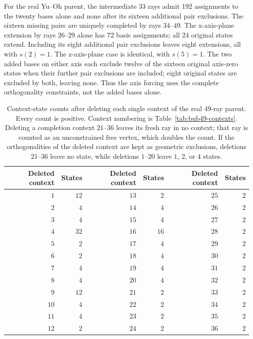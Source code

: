 \documentclass[aps,pra,reprint,superscriptaddress,longbibliography,nofootinbib,floatfix,10pt]{revtex4-2}
\theoremstyle{definition}
\begin{document}
For the real Yu--Oh parent, the intermediate 33 rays admit 192 assignments
to the twenty bases alone and none after its sixteen additional pair
exclusions. The sixteen missing pairs are uniquely completed by rays
$34$--$49$. The x-axis-plane extension by rays $26$--$29$ alone has
72 basis assignments; all 24 original states extend. Including its eight
additional pair exclusions leaves eight extensions, all with $s(2)=1$.
The z-axis-plane case is identical, with $s(5)=1$. The two added bases
on either axis each exclude twelve of the sixteen original axis-zero
states when their further pair exclusions are included; eight original
states are excluded by both, leaving none. Thus the axis forcing uses
the complete orthogonality constraints, not the added bases alone.
\par
\begin{table}[htbp]
\centering\small
\caption{Context-state counts after deleting each single context of the real 49-ray parent. Every count is positive. Context numbering is Table~\ref{tab:bub49-contexts}. Deleting a completion context $21$--$36$ leaves its fresh ray in no context; that ray is counted as an unconstrained free vertex, which doubles the count. If the orthogonalities of the deleted context are kept as geometric exclusions, deletions $21$--$36$ leave no state, while deletions $1$--$20$ leave $1$, $2$, or $4$ states.}\label{tab:parent-criticality}
\begin{tabular}{rr@{\qquad}rr@{\qquad}rr}
\toprule
Deleted context & States & Deleted context & States & Deleted context & States\\\midrule
\rule{0pt}{12pt}$1$ & $12$ & $13$ & $2$ & $25$ & $2$\\
\rule{0pt}{12pt}$2$ & $4$ & $14$ & $4$ & $26$ & $2$\\
\rule{0pt}{12pt}$3$ & $4$ & $15$ & $4$ & $27$ & $2$\\
\rule{0pt}{12pt}$4$ & $32$ & $16$ & $16$ & $28$ & $2$\\
\rule{0pt}{12pt}$5$ & $2$ & $17$ & $4$ & $29$ & $2$\\
\rule{0pt}{12pt}$6$ & $2$ & $18$ & $4$ & $30$ & $2$\\
\rule{0pt}{12pt}$7$ & $4$ & $19$ & $4$ & $31$ & $2$\\
\rule{0pt}{12pt}$8$ & $4$ & $20$ & $4$ & $32$ & $2$\\
\rule{0pt}{12pt}$9$ & $12$ & $21$ & $2$ & $33$ & $2$\\
\rule{0pt}{12pt}$10$ & $4$ & $22$ & $2$ & $34$ & $2$\\
\rule{0pt}{12pt}$11$ & $4$ & $23$ & $2$ & $35$ & $2$\\
\rule{0pt}{12pt}$12$ & $2$ & $24$ & $2$ & $36$ & $2$\\
\bottomrule
\end{tabular}
\end{table}
\end{document}
